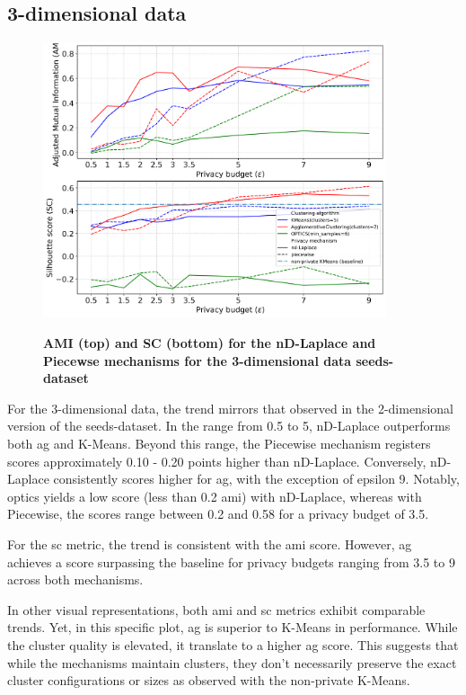\subsection{3-dimensional data}
\begin{figure}[H]
  \centering
  \caption{\textbf{AMI (top) and SC (bottom) for the nD-Laplace and Piecewse mechanisms for the 3-dimensional data seeds-dataset}}
  \includegraphics[width=0.9\textwidth]{Results/nd-laplace/nd-Laplace/seeds-dataset/ami-and-sc_3_dimensions.png}
  \label{fig:validation-seeds-dataset_comparison_3d-laplace}
\end{figure}
For the 3-dimensional data, the trend mirrors that observed in the 2-dimensional version of the seeds-dataset. In the range from 0.5 to 5, nD-Laplace outperforms both \gls{ag} and K-Means. Beyond this range, the Piecewise mechanism registers scores approximately 0.10 - 0.20 points higher than nD-Laplace. Conversely, nD-Laplace consistently scores higher for \gls{ag}, with the exception of epsilon 9. Notably, \gls{optics} yields a low score (less than 0.2 \gls{ami}) with nD-Laplace, whereas with Piecewise, the scores range between 0.2 and 0.58 for a privacy budget of 3.5.

For the \gls{sc} metric, the trend is consistent with the \gls{ami} score. However, \gls{ag} achieves a score surpassing the baseline for privacy budgets ranging from 3.5 to 9 across both mechanisms.

In other visual representations, both \gls{ami} and \gls{sc} metrics exhibit comparable trends. Yet, in this specific plot, \gls{ag} is superior to K-Means in performance. While the cluster quality is elevated, it  translate to a higher \gls{ag} score. This suggests that while the mechanisms maintain clusters, they don't necessarily preserve the exact cluster configurations or sizes as observed with the non-private K-Means.

